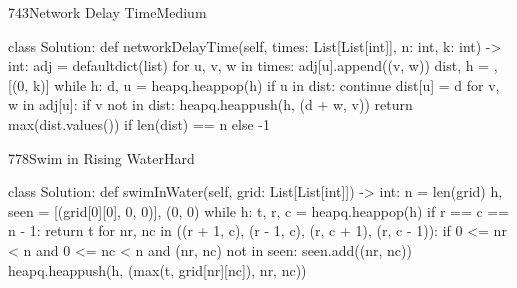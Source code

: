 \begin{problem}{743}{Network Delay Time}{Medium}
\begin{code}
class Solution:
    def networkDelayTime(self, times: List[List[int]], n: int, k: int) -> int:
        adj = defaultdict(list)
        for u, v, w in times:
            adj[u].append((v, w))
        dist, h = {}, [(0, k)]
        while h:
            d, u = heapq.heappop(h)
            if u in dist:
                continue
            dist[u] = d
            for v, w in adj[u]:
                if v not in dist:
                    heapq.heappush(h, (d + w, v))
        return max(dist.values()) if len(dist) == n else -1
\end{code}
\end{problem}

\begin{problem}{778}{Swim in Rising Water}{Hard}
\begin{code}
class Solution:
    def swimInWater(self, grid: List[List[int]]) -> int:
        n = len(grid)
        h, seen = [(grid[0][0], 0, 0)], {(0, 0)}
        while h:
            t, r, c = heapq.heappop(h)
            if r == c == n - 1:
                return t
            for nr, nc in ((r + 1, c), (r - 1, c), (r, c + 1), (r, c - 1)):
                if 0 <= nr < n and 0 <= nc < n and (nr, nc) not in seen:
                    seen.add((nr, nc))
                    heapq.heappush(h, (max(t, grid[nr][nc]), nr, nc))
\end{code}
\end{problem}

